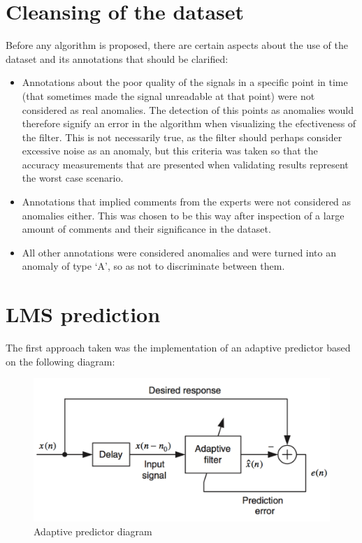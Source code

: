 \documentclass[conference]{IEEEtran}
\begin{document}
\section{Cleansing of the dataset}

Before any algorithm is proposed, there are certain aspects about the use of the dataset and its annotations that should be clarified:\par
\begin{itemize}
\item Annotations about the poor quality of the signals in a specific point in time (that sometimes made the signal unreadable at that point) were not considered as real anomalies. The detection of this points as anomalies would therefore signify an error in the algorithm when visualizing the efectiveness of the filter. This is not necessarily true, as the filter should perhaps consider excessive noise as an anomaly, but this criteria was taken so that the accuracy measurements that are presented when validating results represent the worst case scenario.
\item Annotations that implied comments from the experts were not considered as anomalies either. This was chosen to be this way after inspection of a large amount of comments and their significance in the dataset.
\item All other annotations were considered anomalies and were turned into an anomaly of type `A', so as not to discriminate between them.
\end{itemize}

\section{LMS prediction}

The first approach taken was the implementation of an adaptive predictor based on the following diagram:

\begin{figure}[H]
\centerline{\includegraphics[scale=0.4]{prediction.png}}
\caption{Adaptive predictor diagram}
\label{fig}
\end{figure}
\end{document}
